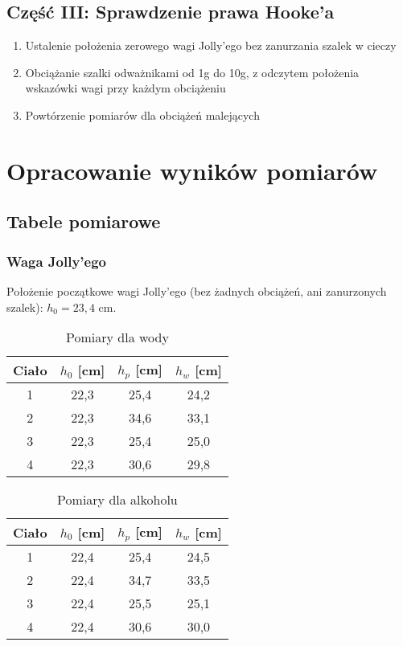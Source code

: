 \documentclass[a4paper,12pt]{article}
\begin{document}
\subsection*{Część III: Sprawdzenie prawa Hooke'a}
\begin{enumerate}
    \setlength{\itemsep}{0em}
    \item Ustalenie położenia zerowego wagi Jolly'ego bez zanurzania szalek w cieczy
    \item Obciążanie szalki odważnikami od 1g do 10g, z odczytem położenia wskazówki wagi przy każdym obciążeniu
    \item Powtórzenie pomiarów dla obciążeń malejących
\end{enumerate}

\section{Opracowanie wyników pomiarów}

\subsection{Tabele pomiarowe}

\subsubsection*{Waga Jolly'ego}

Położenie początkowe wagi Jolly'ego (bez żadnych obciążeń, ani zanurzonych szalek): $h_0 = 23{,}4$ cm.

\begin{table}[h]
    \centering
    \begin{tabular}{|c|c|c|c|}
        \hline
        Ciało & $h_0$ [cm] & $h_p$ [cm] & $h_w$ [cm] \\
        \hline
        1 & 22,3 & 25,4 & 24,2 \\
        \hline
        2 & 22,3 & 34,6 & 33,1 \\
        \hline
        3 & 22,3 & 25,4 & 25,0 \\
        \hline
        4 & 22,3 & 30,6 & 29,8 \\
        \hline
    \end{tabular}
    \caption{Pomiary dla wody}
    \label{tab:waga_jolly_woda}
\end{table}

\begin{table}[h]
    \centering
    \begin{tabular}{|c|c|c|c|}
        \hline
        Ciało & $h_0$ [cm] & $h_p$ [cm] & $h_w$ [cm] \\
        \hline
        1 & 22,4 & 25,4 & 24,5 \\
        \hline
        2 & 22,4 & 34,7 & 33,5 \\
        \hline
        3 & 22,4 & 25,5 & 25,1 \\
        \hline
        4 & 22,4 & 30,6 & 30,0 \\
        \hline
    \end{tabular}
    \caption{Pomiary dla alkoholu}
    \label{tab:waga_jolly_alkohol}
\end{table}
\end{document}
